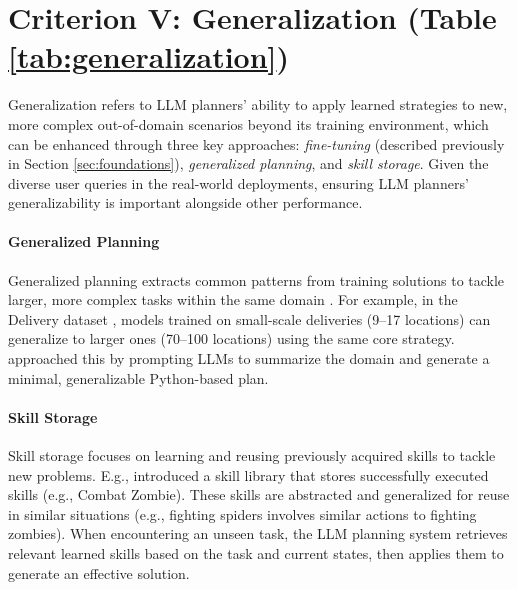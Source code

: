\section{Criterion V: Generalization (Table \ref{tab:generalization})} \label{sec:generalization}

Generalization refers to LLM planners' ability to apply learned strategies to new, more complex out-of-domain scenarios beyond its training environment, which can be enhanced through three key approaches: \emph{fine-tuning} (described previously in Section \ref{sec:foundations}), \emph{generalized planning}, and \emph{skill storage}. Given the diverse user queries in the real-world deployments, ensuring LLM planners' generalizability is important alongside other performance.

\vspace{-0.05in}
\paragraph {Generalized Planning} Generalized planning extracts common patterns from training solutions to tackle larger, more complex tasks within the same domain \cite{srivastava2011new}. 
For example, in the Delivery dataset \cite{yang2022pg3}, models trained on small-scale deliveries (9–17 locations) can generalize to larger ones (70–100 locations) using the same core strategy. 
\citet{silver2024generalized} approached this by prompting LLMs to summarize the domain and generate a minimal, generalizable Python-based plan.  

\vspace{-0.05in}
\paragraph {Skill Storage} Skill storage focuses on learning and reusing previously acquired skills to tackle new problems. E.g., \citet{wang2023voyager} introduced a skill library that stores successfully executed skills (e.g., Combat Zombie). These skills are abstracted and generalized for reuse in similar situations (e.g., fighting spiders involves similar actions to fighting zombies). When encountering an unseen task, the LLM planning system retrieves relevant learned skills based on the task and current states, then applies them to generate an effective solution.
